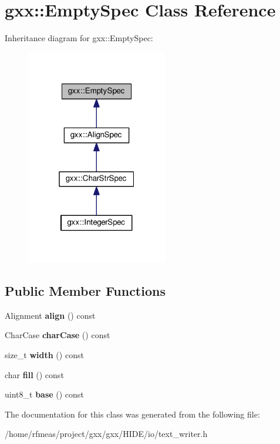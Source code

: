 \hypertarget{classgxx_1_1EmptySpec}{}\section{gxx\+:\+:Empty\+Spec Class Reference}
\label{classgxx_1_1EmptySpec}


Inheritance diagram for gxx\+:\+:Empty\+Spec\+:
\nopagebreak
\begin{figure}[H]
\begin{center}
\leavevmode
\includegraphics[width=175pt]{classgxx_1_1EmptySpec__inherit__graph}
\end{center}
\end{figure}
\subsection*{Public Member Functions}
\begin{DoxyCompactItemize}
\item 
Alignment {\bfseries align} () const \hypertarget{classgxx_1_1EmptySpec_ab675d1c95d89c71a0bf9d7e9ada26e80}{}\label{classgxx_1_1EmptySpec_ab675d1c95d89c71a0bf9d7e9ada26e80}

\item 
Char\+Case {\bfseries char\+Case} () const \hypertarget{classgxx_1_1EmptySpec_af569cd5be978de22ddebbe0eebfc4ec4}{}\label{classgxx_1_1EmptySpec_af569cd5be978de22ddebbe0eebfc4ec4}

\item 
size\+\_\+t {\bfseries width} () const \hypertarget{classgxx_1_1EmptySpec_afc9e0c3e85b971c32eab0928a49bf309}{}\label{classgxx_1_1EmptySpec_afc9e0c3e85b971c32eab0928a49bf309}

\item 
char {\bfseries fill} () const \hypertarget{classgxx_1_1EmptySpec_ac74f7a8bb9d44c771b04a7d9b68ab486}{}\label{classgxx_1_1EmptySpec_ac74f7a8bb9d44c771b04a7d9b68ab486}

\item 
uint8\+\_\+t {\bfseries base} () const \hypertarget{classgxx_1_1EmptySpec_ab3e63ff4d910490a2c8ad5e2bbff16d0}{}\label{classgxx_1_1EmptySpec_ab3e63ff4d910490a2c8ad5e2bbff16d0}

\end{DoxyCompactItemize}


The documentation for this class was generated from the following file\+:\begin{DoxyCompactItemize}
\item 
/home/rfmeas/project/gxx/gxx/\+H\+I\+D\+E/io/text\+\_\+writer.\+h\end{DoxyCompactItemize}
